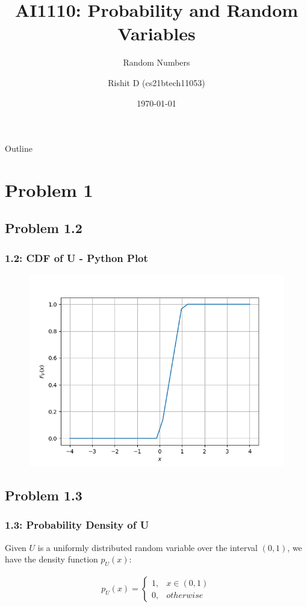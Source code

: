 \documentclass{beamer}
\title{AI1110: Probability and Random Variables}
\subtitle{Random Numbers}
\author{Rishit D (cs21btech11053)}
\institute{IIT Hyderabad}
\date{\today}
\begin{document}
\begin{frame}
	\titlepage 
\end{frame}

\begin{frame}{Outline}
	\tableofcontents
\end{frame}

\section{Problem 1}

\subsection{Problem 1.2}

\begin{frame}
	\frametitle{1.2: CDF of U - Python Plot}
	\begin{figure}
		\centerline{\includegraphics[width=\textheight]{../figs/uni_cdf.png}}
		\label{fig1}
	\end{figure}
	
\end{frame}	
\subsection{Problem 1.3}

\begin{frame}
	\frametitle{1.3: Probability Density of U}

	Given $U$ is a uniformly distributed random variable over the interval $(0, 1)$, we have the density function $p_U(x)$:

	\begin{align}
		p_U(x) = 
		\begin{cases}
			1, & x \in (0, 1) \\
			0, & otherwise
		\end{cases}
		\label{eq:PDF}
	\end{align}
\end{frame}
\end{document}

